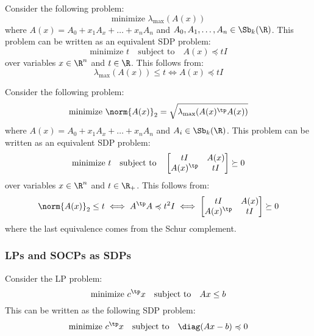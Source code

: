 \begin{example}
    Consider the following problem:
    \begin{equation*}
        \text{minimize } \lambda_{\max}(A(x))
    \end{equation*}
    where $A(x)=A_0+x_1A_x+\dots+x_nA_n$ and $A_0, A_1, \dots, A_n\in\Sb_k(\R)$. This problem can be written as an equivalent SDP problem:
    \begin{equation*}
        \text{minimize } t \quad\text{subject to}\quad A(x)\preccurlyeq tI
    \end{equation*}
    over variables $x\in\R^n$ and $t\in\R$. This follows from:
    \begin{equation*}
        \lambda_{\max}(A(x))\leq t \iff A(x)\preccurlyeq tI
    \end{equation*}
\end{example}

\begin{example}
    Consider the following problem:
    \begin{equation*}
        \text{minimize } \norm{A(x)}_2 = \sqrt{\lambda_{\max}(A(x)^\tp A(x))}
    \end{equation*}
    where $A(x)=A_0+x_1A_x+\dots+x_nA_n$ and $A_i\in\Sb_k(\R)$. This problem can be written as an equivalent SDP problem:
    \begin{equation*}
        \text{minimize } t \quad\text{subject to}\quad \begin{bmatrix}
            tI & A(x)\\
            A(x)^\tp & tI
        \end{bmatrix}\succeq0
    \end{equation*}
    over variables $x\in\R^n$ and $t\in\R_+$. This follows from:
    \begin{equation*}
        \norm{A(x)}_2\leq t \iff A^\tp A\preccurlyeq t^2I \iff \begin{bmatrix}
            tI & A(x)\\
            A(x)^\tp & tI
        \end{bmatrix}\succeq0
    \end{equation*}
    where the last equivalence comes from the Schur complement.
\end{example}

\subsubsection{LPs and SOCPs as SDPs}
\begin{property}
    Consider the LP problem:
    \begin{equation*}
        \text{minimize } c^\tp x \quad\text{subject to}\quad Ax\leq b
    \end{equation*}
    This can be written as the following SDP problem:
    \begin{equation*}
        \text{minimize } c^\tp x \quad\text{subject to}\quad \diag(Ax-b)\preccurlyeq0
    \end{equation*}
\end{property}

